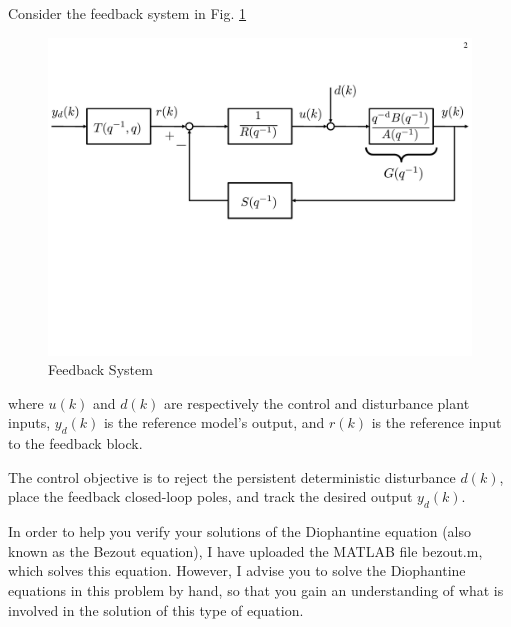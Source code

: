 \item
Consider the feedback system in Fig. \ref{pole-placement-feedback-loop}
\begin{figure}[h]
    \centering
    \includegraphics[width=4.5in]{pole-placement-feedback-loop-yd}
    \caption{Feedback System}
    \label{pole-placement-feedback-loop}
\end{figure}
where $u(k)$ and $d(k)$ are respectively the control and disturbance plant inputs, $y_d(k)$ is the reference model's output, and $r(k)$ is the reference input to the feedback block.

The control objective is to reject the persistent deterministic disturbance $d(k)$, place the feedback closed-loop poles, and  track the desired output $y_d(k)$.

In order to help you verify your solutions of the Diophantine equation (also known as the Bezout equation), I have uploaded the MATLAB file bezout.m, which solves this equation. However, I advise you to solve the Diophantine equations in this problem by hand, so that you gain an understanding of what is involved in the solution of this type of equation.

